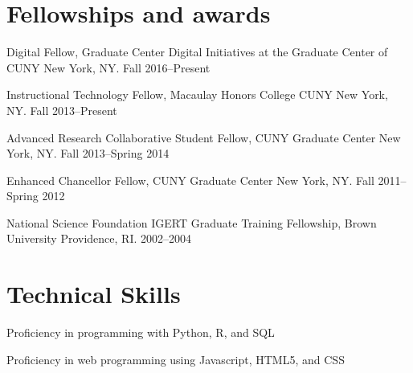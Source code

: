 \documentclass[letterpaper]{article}
\renewenvironment{itemize}{
  \begin{list}{}{
    \setlength{\leftmargin}{1.5em}
  }
}{
  \end{list}
}
\begin{document}
\section*{Fellowships and awards}
\begin{itemize}
  \item Digital Fellow, Graduate Center Digital Initiatives at the Graduate Center of CUNY New York, NY. Fall 2016--Present
  \item Instructional Technology Fellow, Macaulay Honors College CUNY New York, NY. Fall 2013--Present
  \item Advanced Research Collaborative Student Fellow, CUNY Graduate Center New York, NY. Fall 2013--Spring 2014
  \item Enhanced Chancellor Fellow, CUNY Graduate Center New York, NY. Fall 2011--Spring 2012
  \item National Science Foundation IGERT Graduate Training Fellowship, Brown University Providence, RI. 2002--2004
\end{itemize}

\section*{Technical Skills}

\begin{itemize}
    \item Proficiency in programming with Python, R, and SQL
    \item Proficiency in web programming using Javascript, HTML5, and CSS
\end{itemize}
\end{document}
